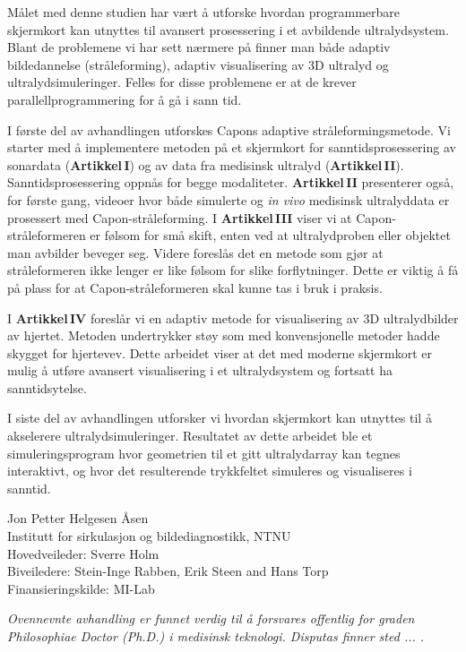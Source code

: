 \documentclass[10pt,b5paper,twoside]{book}
\begin{document}
Målet med denne studien har vært å utforske hvordan programmerbare skjermkort kan utnyttes til avansert prosessering i et avbildende ultralydsystem. Blant de problemene vi har sett nærmere på finner man både adaptiv bildedannelse (stråleforming), adaptiv visualisering av 3D ultralyd og ultralydsimuleringer. Felles for disse problemene er at de krever parallellprogrammering for å gå i sann tid.

I første del av avhandlingen utforskes Capons adaptive stråleformingsmetode. Vi starter med å implementere metoden på et skjermkort for sanntidsprosessering av sonardata (\textbf{Artikkel\,I}) og av data fra medisinsk ultralyd (\textbf{Artikkel\,II}). Sanntidsprosessering oppnås for begge modaliteter. \textbf{Artikkel\,II} presenterer også, for første gang, videoer hvor både simulerte og \textit{in vivo} medisinsk ultralyddata er prosessert med Capon-stråleforming. I \textbf{Artikkel\,III} viser vi at Capon-stråleformeren er følsom for små skift, enten ved at ultralydproben eller objektet man avbilder beveger seg. Videre foreslås det en metode som gjør at stråleformeren ikke lenger er like følsom for slike forflytninger. Dette er viktig å få på plass for at Capon-stråleformeren skal kunne tas i bruk i praksis.

I \textbf{Artikkel\,IV} foreslår vi en adaptiv metode for visualisering av 3D ultralydbilder av hjertet. Metoden undertrykker støy som med konvensjonelle metoder hadde skygget for hjertevev. Dette arbeidet viser at det med moderne skjermkort er mulig å utføre avansert visualisering i et ultralydsystem og fortsatt ha sanntidsytelse.

I siste del av avhandlingen utforsker vi hvordan skjermkort kan utnyttes til å akselerere ultralydsimuleringer. Resultatet av dette arbeidet ble et simuleringsprogram hvor geometrien til et gitt ultralydarray kan tegnes interaktivt, og hvor det resulterende trykkfeltet simuleres og visualiseres i sanntid.

\vspace{0.3cm}
\noindent Jon Petter Helgesen \AA{}sen\\
Institutt for sirkulasjon og bildediagnostikk, NTNU\\
Hovedveileder: Sverre Holm\\ 
Biveiledere: Stein-Inge Rabben, Erik Steen and Hans Torp\\
Finansieringskilde: MI-Lab

\vspace{0.2cm}
\noindent \emph{Ovennevnte avhandling er funnet verdig til \aa{} forsvares offentlig for graden Philosophiae Doctor (Ph.D.) i medisinsk teknologi. Disputas finner sted ... .}
\end{document}
